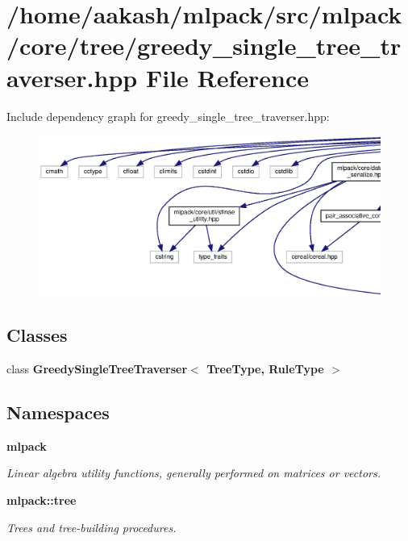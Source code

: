 \section{/home/aakash/mlpack/src/mlpack/core/tree/greedy\+\_\+single\+\_\+tree\+\_\+traverser.hpp File Reference}
\label{greedy__single__tree__traverser_8hpp}
Include dependency graph for greedy\+\_\+single\+\_\+tree\+\_\+traverser.\+hpp\+:
\nopagebreak
\begin{figure}[H]
\begin{center}
\leavevmode
\includegraphics[width=350pt]{greedy__single__tree__traverser_8hpp__incl}
\end{center}
\end{figure}
\subsection*{Classes}
\begin{DoxyCompactItemize}
\item 
class \textbf{ Greedy\+Single\+Tree\+Traverser$<$ Tree\+Type, Rule\+Type $>$}
\end{DoxyCompactItemize}
\subsection*{Namespaces}
\begin{DoxyCompactItemize}
\item 
 \textbf{ mlpack}
\begin{DoxyCompactList}\small\item\em Linear algebra utility functions, generally performed on matrices or vectors. \end{DoxyCompactList}\item 
 \textbf{ mlpack\+::tree}
\begin{DoxyCompactList}\small\item\em Trees and tree-\/building procedures. \end{DoxyCompactList}\end{DoxyCompactItemize}


